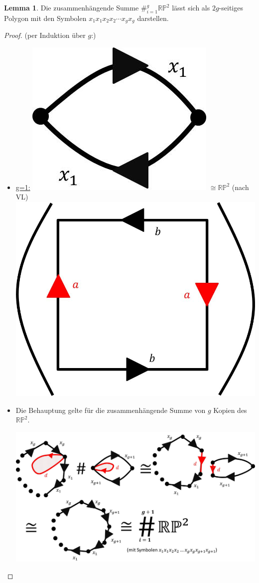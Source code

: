 \documentclass[a4paper,11pt,notitlepage]{report}
\theoremstyle{definition}
\newtheorem{lemma}{Lemma}[chapter]
\newcommand{\R}{{\ensuremath{\mathbb{R}}}}
\newcommand{\Prim}{{\ensuremath{\mathbb{P}}}}
\begin{document}
\begin{lemma}
	Die zusammenhängende Summe $\#_{i=1}^g{\R \Prim^2}$ lässt sich als $2g$-seitiges Polygon mit den Symbolen $x_1x_1x_2x_2 \cdots x_gx_g$ darstellen.
\end{lemma}

\begin{proof}{(per Induktion über $g$:)}
	\begin{itemize}
		\item \underline{g=1:} 
	\includegraphics[scale=0.3]{images/2012_01_30_Bild2.jpg} $\cong \R \Prim^2$ (nach VL)
	\includegraphics[scale=0.3]{images/2012_01_30_Bild3.jpg}
		\item Die Behauptung gelte für die zusammenhängende Summe von $g$ Kopien des $\R \Prim^2$.
		\begin{center}
		\includegraphics[scale=0.3]{images/2012_01_30_Bild4.jpg}

\end{center}
\end{itemize}
\end{proof}
\end{document}
